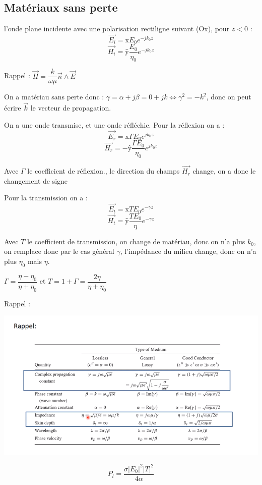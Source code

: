 \documentclass[12pt,a4paper]{report}
\begin{document}
\subsection{Matériaux sans perte}

l'onde plane incidente avec une polarisation rectiligne suivant (Ox), pour \(z<0\) :
\[
	\vec{E_i} = \text{\^x} E_0 e^{-jk_0z}
\]
\[
	\vec{H_i} = \text{\^y} \dfrac{E_0}{\eta_0} e^{-jk_0z}
\]

Rappel : \(\vec{H} = \dfrac{k}{\omega\mu} \vec{n} \wedge \vec{E}\)

On a matériau sans perte donc : \(\gamma = \alpha + j \beta = 0 + jk \Leftrightarrow \gamma^2 = -k^2\), donc on peut écrire \(\vec{k}\) le vecteur de propagation.

On a une onde transmise, et une onde réfléchie.
Pour la réflexion on a :
\[
	\vec{E_r} = \text{\^x} \Gamma E_0 e^{jk_0z}
\]
\[
	\vec{H_r} = -\text{\^y} \dfrac{\Gamma E_0}{\eta_0} e^{j k_0 z}
\]

Avec \(\Gamma\) le coefficient de réflexion., le direction du champs \(\vec{H_r}\) change, on a donc le changement de signe

Pour la transmission on a :
\[
	\vec{E_t} = \text{\^x} T E_0 e^{- \gamma z}
\]
\[
	\vec{H_t} = \text{\^y} \dfrac{T E_0}{\eta} e^{-\gamma z}
\]

Avec \(T\) le coefficient de transmission, on change de matériau, donc on n'a plus \(k_0\), on remplace donc par le cas général \(\gamma\), l'impédance du milieu change, donc on n'a plus \(\eta_0\) mais \(\eta\).

\(\Gamma = \dfrac{\eta - \eta_0}{\eta + \eta_0}\) et \(T = 1 + \Gamma = \dfrac{2\eta}{\eta + \eta_0}\)

Rappel :

\includegraphics[scale=0.5]{tab.png}

\[
	P_l = \dfrac{\sigma |E_0|^2 |T|^2}{4\alpha}
\]
\end{document}
